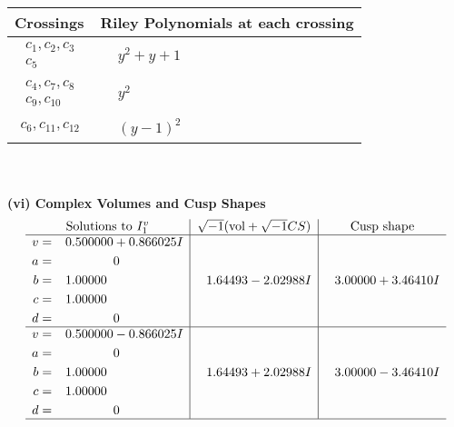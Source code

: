 \documentclass[1p]{elsarticle_modified}
\theoremstyle{definition}
\newcommand{\I}{\sqrt{-1}}
\begin{document}
\begin{tabular}{m{50pt}|m{274pt}}
Crossings & \hspace{64pt}Riley Polynomials at each crossing \\
\hline $$\begin{aligned}c_{1},c_{2},c_{3}\\c_{5}\end{aligned}$$&$\begin{aligned}
&y^2+y+1
\end{aligned}$\\
\hline $$\begin{aligned}c_{4},c_{7},c_{8}\\c_{9},c_{10}\end{aligned}$$&$\begin{aligned}
&y^2
\end{aligned}$\\
\hline $$\begin{aligned}c_{6},c_{11},c_{12}\end{aligned}$$&$\begin{aligned}
&(y-1)^2
\end{aligned}$\\
\hline
\end{tabular}\\~\\
\newpage\flushleft \textbf{(vi) Complex Volumes and Cusp Shapes}
$$\begin{array}{c|c|c}  
\text{Solutions to }I^v_{1}& \I (\text{vol} + \sqrt{-1}CS) & \text{Cusp shape}\\
 \hline 
\begin{aligned}
v &= \phantom{-}0.500000 + 0.866025 I \\
a &= \phantom{-0.000000 } 0 \\
b &= \phantom{-}1.00000\phantom{ +0.000000I} \\
c &= \phantom{-}1.00000\phantom{ +0.000000I} \\
d &= \phantom{-0.000000 } 0\end{aligned}
 & \phantom{-}1.64493 - 2.02988 I & \phantom{-}3.00000 + 3.46410 I \\ \hline\begin{aligned}
v &= \phantom{-}0.500000 - 0.866025 I \\
a &= \phantom{-0.000000 } 0 \\
b &= \phantom{-}1.00000\phantom{ +0.000000I} \\
c &= \phantom{-}1.00000\phantom{ +0.000000I} \\
d &= \phantom{-0.000000 } 0\end{aligned}
 & \phantom{-}1.64493 + 2.02988 I & \phantom{-}3.00000 - 3.46410 I\\
 \hline 
 \end{array}$$\newpage\newpage\renewcommand{\arraystretch}{1}
\end{document}
